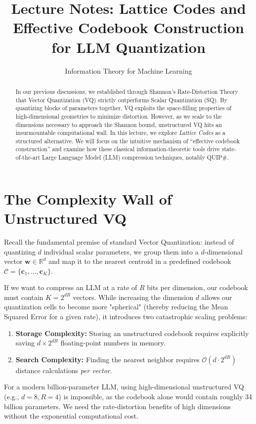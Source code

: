 \documentclass[11pt]{article}
\title{\textbf{Lecture Notes: Lattice Codes and Effective Codebook Construction for LLM Quantization}}
\author{Information Theory for Machine Learning}
\date{}
\begin{document}
\maketitle

\begin{abstract}
In our previous discussions, we established through Shannon's Rate-Distortion Theory that Vector Quantization (VQ) strictly outperforms Scalar Quantization (SQ). By quantizing blocks of parameters together, VQ exploits the space-filling properties of high-dimensional geometries to minimize distortion. However, as we scale to the dimensions necessary to approach the Shannon bound, unstructured VQ hits an insurmountable computational wall. In this lecture, we explore \textit{Lattice Codes} as a structured alternative. We will focus on the intuitive mechanism of ``effective codebook construction'' and examine how these classical information-theoretic tools drive state-of-the-art Large Language Model (LLM) compression techniques, notably QUIP\#.
\end{abstract}

\section{The Complexity Wall of Unstructured VQ}

Recall the fundamental premise of standard Vector Quantization: instead of quantizing $d$ individual scalar parameters, we group them into a $d$-dimensional vector $\mathbf{w} \in \mathbb{R}^d$ and map it to the nearest centroid in a predefined codebook $\mathcal{C} = \{\mathbf{c}_1, \dots, \mathbf{c}_K\}$.

If we want to compress an LLM at a rate of $R$ bits per dimension, our codebook must contain $K = 2^{dR}$ vectors. While increasing the dimension $d$ allows our quantization cells to become more "spherical" (thereby reducing the Mean Squared Error for a given rate), it introduces two catastrophic scaling problems:
\begin{enumerate}
    \item \textbf{Storage Complexity:} Storing an unstructured codebook requires explicitly saving $d \times 2^{dR}$ floating-point numbers in memory.
    \item \textbf{Search Complexity:} Finding the nearest neighbor requires $\mathcal{O}(d \cdot 2^{dR})$ distance calculations \textit{per vector}.
\end{enumerate}
For a modern billion-parameter LLM, using high-dimensional unstructured VQ (e.g., $d=8, R=4$) is impossible, as the codebook alone would contain roughly 34 billion parameters. We need the rate-distortion benefits of high dimensions without the exponential computational cost. 
\end{document}
